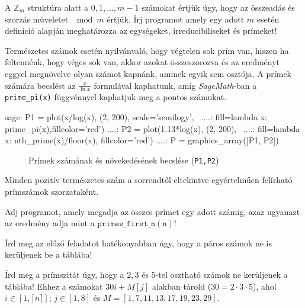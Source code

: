 \begin{exercise} A $\mathbb{Z}_m$ struktúra alatt a ${0,1,\dots, m-1}$
  számokat értjük úgy, hogy az összeadás és szorzás műveletet $\mod m$ értjük.
  Írj programot amely egy adott $m$ esetén definíció alapján meghatározza az
  egységeket, irreducibiliseket és prímeket!
\end{exercise}

Természetes számok esetén nyilvánvaló, hogy végtelen sok prím van, hiszen ha
feltennénk, hogy véges sok van, akkor azokat összeszorozva és az eredményt
eggyel megnövelve olyan számot kapnánk, aminek egyik sem osztója.
A prímek számára becslést az $\frac{x}{\ln x}$ formulával kaphatunk, amíg
\emph{SageMath}-ban a \texttt{prime\_pi(x)} függvénnyel kaphatjuk meg a
pontos számukat.
\begin{sageexample}
  sage: P1 = plot(x/log(x), (2, 200), scale='semilogy', \
  ....:     fill=lambda x: prime_pi(x),fillcolor='red')
  ....: P2 = plot(1.13*log(x), (2, 200), \
  ....:     fill=lambda x: nth_prime(x)/floor(x), fillcolor='red')
  ....: P = graphics_array([P1, P2])
\end{sageexample}
\begin{figure}[ht]
  \centering
  \caption{Prímek számának és növekedésének becslése (\texttt{P1,P2}) }
\end{figure}

\begin{theorem} Minden pozitív természetes szám a
  sorrendtől eltekintve egyértelműen felírható prímszámok szorzataként.
\end{theorem}

\begin{exercise} Adj programot, amely megadja az
  összes prímet egy adott számig, azaz ugyanazt az eredmény adja mint a
  $\mathtt{primes\_first\_n(n)}$!
\end{exercise}

\begin{exercise} Írd meg az előző feladatot hatékonyabban úgy, hogy a páros
  számok ne is kerüljenek be a táblába!
\end{exercise}

\begin{exercise} Írd meg a prímszitát úgy, hogy a $2,3$ és $5$-tel osztható
  számok ne kerüljenek a táblába! Ehhez a számokat $30i+M[j]$ alakban tárold
  ($30=2\cdot 3\cdot 5$), ahol $i\in[1,\lceil n\rceil]$; $j\in[1,8]$ és
  $M=[1,7,11,13,17,19,23,29]$.
\end{exercise}

